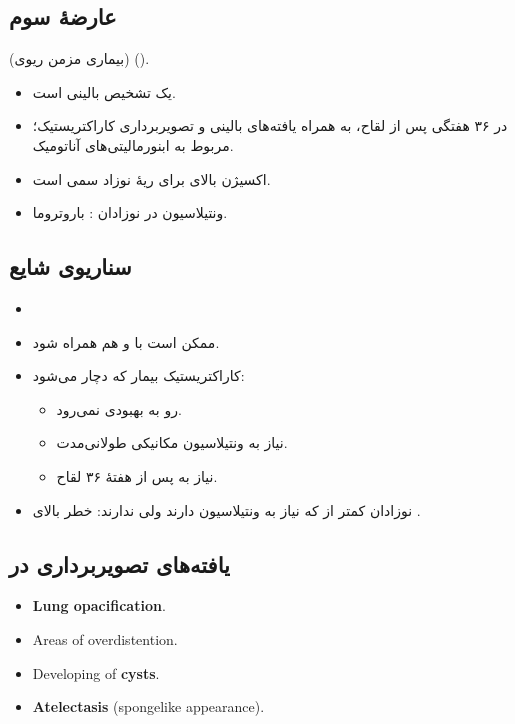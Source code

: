 \documentclass[12pt,a4paper]{article}
\begin{document}
\subsection*{عارضهٔ سوم }
 (بیماری مزمن ریوی) ().
\begin{itemize}
\item {} یک تشخیص بالینی است.
\item {} در ۳۶ هفتگی پس از لقاح، به همراه یافته‌های بالینی و تصویربرداری کاراکتریستیک؛ مربوط به ابنورمالیتی‌های آناتومیک.
\item اکسیژن بالای  برای ریهٔ نوزاد سمی است.
\item ونتیلاسیون  در نوزادان : باروتروما.
\end{itemize}
\subsection*{سناریوی شایع }
\begin{itemize}
\item {}
\item ممکن است با  و  هم همراه شود.
\item کاراکتریستیک بیمار  که دچار  می‌شود:
\begin{itemize}
\item {}  رو به بهبودی نمی‌رود.
\item نیاز به ونتیلاسیون مکانیکی طولانی‌مدت.
\item نیاز به  پس از هفتهٔ ۳۶ لقاح.
\end{itemize}
\item نوزادان کمتر از  که نیاز به ونتیلاسیون دارند ولی  ندارند: خطر بالای .
\end{itemize}
\subsection*{یافته‌های تصویربرداری در }
\begin{latin}
\begin{itemize}
\item \textbf{Lung opacification}.
\item Areas of overdistention.
\item Developing of \textbf{cysts}.
\item \textbf{Atelectasis} (spongelike appearance).
\end{itemize}
\end{latin}
\end{document}
